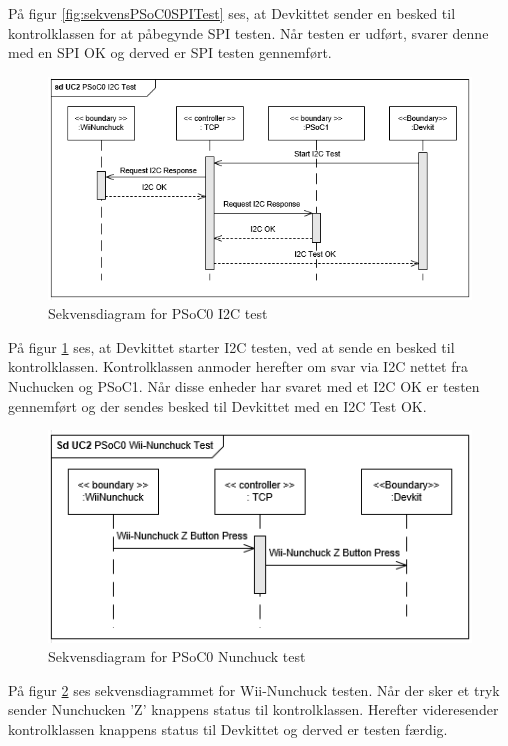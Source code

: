 På figur \ref{fig:sekvensPSoC0SPITest} ses, at Devkittet sender en besked til kontrolklassen for at påbegynde SPI testen. Når testen er udført, svarer denne med en SPI OK og derved er SPI testen gennemført.

\begin{figure}[H]
	\centering
	\includegraphics[width=\textwidth] {Systemarkitektur/images/SDPSoC0I2CTest}
	\caption{Sekvensdiagram for PSoC0 I2C test}
	\label{fig:sekvensPSoC0I2CTest}
\end{figure}

På figur \ref{fig:sekvensPSoC0I2CTest} ses, at Devkittet starter I2C testen, ved at sende en besked til kontrolklassen. Kontrolklassen anmoder herefter om svar via I2C nettet fra Nuchucken og PSoC1. Når disse enheder har svaret med et I2C OK er testen gennemført og der sendes besked til Devkittet med en I2C Test OK.

\begin{figure}[H]
	\centering
	\includegraphics[width=\textwidth] {Systemarkitektur/images/SDPSoC0NunchuckTest}
	\caption{Sekvensdiagram for PSoC0 Nunchuck test}
	\label{fig:sekvensPSoC0NunchuckTest}
\end{figure}

På figur \ref{fig:sekvensPSoC0NunchuckTest} ses sekvensdiagrammet for Wii-Nunchuck testen. Når der sker et tryk sender Nunchucken 'Z' knappens status til kontrolklassen. Herefter videresender kontrolklassen knappens status til Devkittet og derved er testen færdig.\newline

